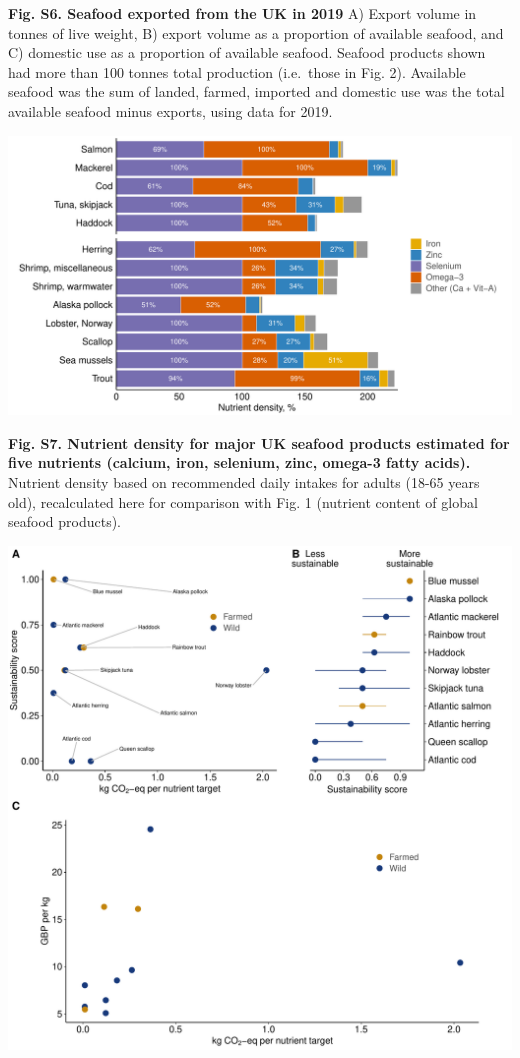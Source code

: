 \documentclass[
]{article}
\begin{document}
\textbf{Fig. S6. Seafood exported from the UK in 2019} A) Export volume
in tonnes of live weight, B) export volume as a proportion of available
seafood, and C) domestic use as a proportion of available seafood.
Seafood products shown had more than 100 tonnes total production
(i.e.~those in Fig. 2). Available seafood was the sum of landed, farmed,
imported and domestic use was the total available seafood minus exports,
using data for 2019.

\newpage

\begin{center}\includegraphics[height=0.8\textheight]{fig/final/FigureSX_UK_fournut_density} \end{center}

\textbf{Fig. S7. Nutrient density for major UK seafood products
estimated for five nutrients (calcium, iron, selenium, zinc, omega-3
fatty acids).} Nutrient density based on recommended daily intakes for
adults (18-65 years old), recalculated here for comparison with Fig. 1
(nutrient content of global seafood products).

\newpage

\begin{center}\includegraphics[height=0.8\textheight]{fig/final/FigureSX_GFGscore} \end{center}
\end{document}

